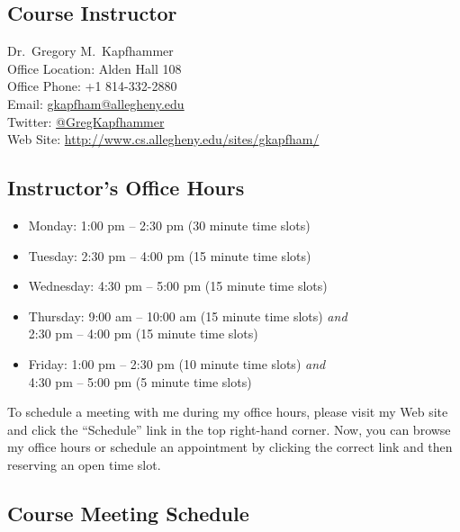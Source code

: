 

\usepackage[compact]{titlesec}



\subsection*{Course Instructor}
Dr.\ Gregory M.\ Kapfhammer\\
\noindent Office Location: Alden Hall 108 \\
\noindent Office Phone: +1 814-332-2880 \\
\noindent Email: \url{gkapfham@allegheny.edu} \\
\noindent Twitter: \url{@GregKapfhammer} \\
\noindent Web Site: \url{http://www.cs.allegheny.edu/sites/gkapfham/} 

\subsection*{Instructor's Office Hours}

\begin{itemize}
	\itemsep 0em
	\item Monday: 1:00 pm -- 2:30 pm (30 minute time slots)
	\item Tuesday: 2:30 pm -- 4:00 pm (15 minute time slots)
	\item Wednesday: 4:30 pm -- 5:00 pm (15 minute time slots)
	\item Thursday: 9:00 am -- 10:00 am (15 minute time slots) {\em and} \\ \hspace*{.69in} 2:30 pm -- 4:00 pm (15 minute time slots)
	\item Friday: 1:00 pm -- 2:30 pm (10 minute time slots) {\em and} \\ \hspace*{.49in} 4:30 pm -- 5:00 pm (5 minute time slots)
\end{itemize}

\noindent
To schedule a meeting with me during my office hours, please visit my Web site and click the ``Schedule'' link in the
top right-hand corner. Now, you can browse my office hours or schedule an appointment by clicking the correct link and
then reserving an open time slot. 

\subsection*{Course Meeting Schedule}

